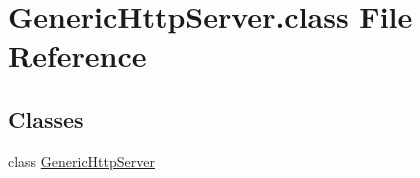 \hypertarget{GenericHttpServer_8class}{\section{Generic\-Http\-Server.\-class File Reference}
\label{GenericHttpServer_8class}
}
\subsection*{Classes}
\begin{DoxyCompactItemize}
\item 
class \hyperlink{classGenericHttpServer}{Generic\-Http\-Server}
\end{DoxyCompactItemize}

